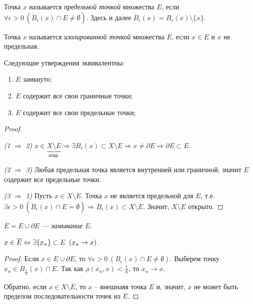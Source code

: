 \begin{definition}
    Точка $x$ называется \emph{предельной точкой} множества $E$, если $\forall \epsilon > 0 \ (\mathring{B}_\epsilon(x) \cap E \neq \emptyset)$. Здесь и далее $\mathring{B}_\epsilon(x) = B_\epsilon(x) \setminus \{x\}$.
\end{definition}

\begin{definition}
    Точка $x$ называется \emph{изолированной точкой} множества $E$, если $x \in E$ и $x$ не предельная.
\end{definition}

\begin{theorem}
    Следующие утверждения эквивалентны:
    \begin{enumerate}
        \item $E$ замкнуто;
        \item $E$ содержит все свои граничные точки;
        \item $E$ содержит все свои предельные точки;
    \end{enumerate}

    \begin{proof}~
    
        \emph{(1 $\Rightarrow$ 2)} $x \in \underbrace{X \setminus E}_{\text{откр.}} \Rightarrow \exists B_\epsilon(x) \subset X \setminus E \Rightarrow x \neq \partial E \Rightarrow \partial E \subset E$.

        \emph{(2 $\Rightarrow$ 3)} Любая предельная точка является внутренней или граничной, значит $E$ содержит все предельные точки.

        \emph{(3 $\Rightarrow$ 1)} Пусть $x \in X \setminus E$. Точка $x$ не является предельной для $E$, т.е. $\exists \epsilon > 0 \ (\mathring{B}_\epsilon(x) \cap E = \emptyset) \Rightarrow B_\epsilon(x) \subset X \setminus E$. Значит, $X \setminus E$ открыто.

    \end{proof}
\end{theorem}

\begin{definition}
    $\overline{E} = E \cup \partial E$ --- \emph{замыкание} $E$.
\end{definition}

\begin{note}
    $x \in \overline{E} \Leftrightarrow \exists \{x_{n}\} \subset E \ \left(x_{n} \to x\right)$.
\end{note}

\begin{proof}
    Если $x \in E \cup \partial E$, то $\forall \epsilon > 0 \ (B_{\epsilon}(x) \cap E \neq \emptyset)$. Выберем точку $x_{n} \in B_{\frac{1}{n}}(x) \cap E$. Так как $\rho(x_{n}, x) < \frac{1}{n}$, то $x_{n} \to x$.

    Обратно, если $x \in X \setminus \overline{E}$, то $x$ -- внешнаяя точка $E$ и, значит, $x$ не может быть пределом последовательности точек из $E$.
\end{proof}

